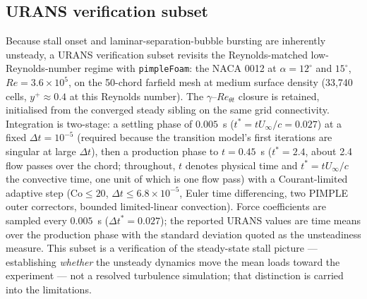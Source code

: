 \documentclass[11pt,a4paper]{article}
\begin{document}
\subsection{URANS verification subset}\label{sec:uransmethod}
Because stall onset and laminar-separation-bubble bursting are inherently unsteady, a URANS verification subset revisits the Reynolds-matched low-Reynolds-number regime with \texttt{pimpleFoam}: the NACA 0012 at $\alpha = 12^\circ$ and $15^\circ$, $Re = 3.6\times10^5$, on the 50-chord farfield mesh at medium surface density (33,740 cells, $y^+ \approx 0.4$ at this Reynolds number). The $\gamma$--$Re_{\theta t}$ closure is retained, initialised from the converged steady sibling on the same grid connectivity. Integration is two-stage: a settling phase of $0.005$~s ($t^* = tU_\infty/c = 0.027$) at a fixed $\Delta t = 10^{-5}$ (required because the transition model's first iterations are singular at large $\Delta t$), then a production phase to $t = 0.45$~s ($t^* = 2.4$, about 2.4 flow passes over the chord; throughout, $t$ denotes physical time and $t^* = tU_\infty/c$ the convective time, one unit of which is one flow pass) with a Courant-limited adaptive step ($\mathrm{Co} \le 20$, $\Delta t \le 6.8\times10^{-5}$, Euler time differencing, two PIMPLE outer correctors, bounded limited-linear convection). Force coefficients are sampled every $0.005$~s ($\Delta t^* = 0.027$); the reported URANS values are time means over the production phase with the standard deviation quoted as the unsteadiness measure. This subset is a verification of the steady-state stall picture --- establishing \emph{whether} the unsteady dynamics move the mean loads toward the experiment --- not a resolved turbulence simulation; that distinction is carried into the limitations.
\end{document}
